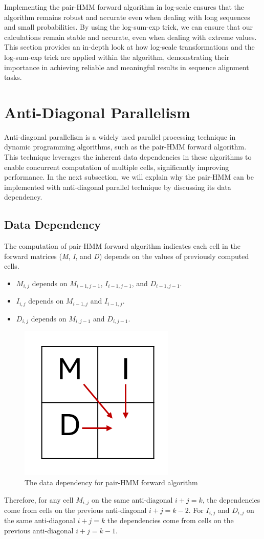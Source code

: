 \documentclass[PhD]{PHlab-thesis}
\begin{document}
Implementing the pair-HMM forward algorithm in log-scale ensures that the algorithm remains robust and accurate even when dealing with long sequences and small probabilities. By using the log-sum-exp trick, we can ensure that our calculations remain stable and accurate, even when dealing with extreme values. This section provides an in-depth look at how log-scale transformations and the log-sum-exp trick are applied within the algorithm, demonstrating their importance in achieving reliable and meaningful results in sequence alignment tasks.

\section{Anti-Diagonal Parallelism}
Anti-diagonal parallelism is a widely used parallel processing technique in dynamic programming algorithms, such as the pair-HMM forward algorithm. This technique leverages the inherent data dependencies in these algorithms to enable concurrent computation of multiple cells, significantly improving performance. In the next subsection, we will explain why the pair-HMM can be implemented with anti-diagonal parallel technique by discussing its data dependency.
\subsection{Data Dependency}
The computation of pair-HMM forward algorithm indicates each cell in the forward matrices (\textit{M}, \textit{I}, and \textit{D}) depends on the values of previously computed cells.
\begin{itemize}
    \item $M_{i,j}$ depends on $M_{i-1,j-1}$, $I_{i-1,j-1}$, and $D_{i-1,j-1}$.
    \item $I_{i,j}$ depends on $M_{i-1,j}$ and $I_{i-1,j}$.
    \item $D_{i,j}$ depends on $M_{i,j-1}$ and $D_{i,j-1}$.
\end{itemize}
\begin{figure}[h]
    \centering
    \includegraphics[width=0.5\linewidth]{figure/data-dependency.png}
    \caption{The data dependency for pair-HMM forward algorithm}
    \label{fig:data dependency}
\end{figure}
Therefore, for any cell $M_{i,j}$ on the same anti-diagonal $i+j=k$, the dependencies come from cells on the previous anti-diagonal $i+j=k-2$. For $I_{i,j}$ and $D_{i,j}$ on the same anti-diagonal $i+j=k$ the dependencies come from cells on the previous anti-diagonal $i+j=k−1$.
\end{document}
